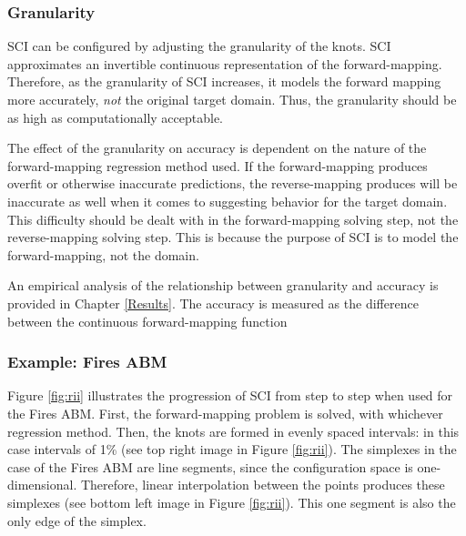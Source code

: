 \subsubsection{Granularity}

SCI can be configured by adjusting the granularity of the knots.
SCI approximates an invertible continuous representation of the forward-mapping.
Therefore, as the granularity of SCI increases, it models the forward mapping more accurately, \textit{not} the original target domain.
Thus, the granularity should be as high as computationally acceptable.

The effect of the granularity on accuracy is dependent on the nature of the forward-mapping regression method used.
If the forward-mapping produces overfit or otherwise inaccurate predictions, the reverse-mapping produces will be inaccurate as well when it comes to suggesting behavior for the target domain.
This difficulty should be dealt with in the forward-mapping solving step, not the reverse-mapping solving step.
This is because the purpose of SCI is to model the forward-mapping, not the domain.

An empirical analysis of the relationship between granularity and accuracy is provided in Chapter \ref{Results}.
The accuracy is measured as the difference between the continuous forward-mapping function


\subsubsection{Example: Fires ABM}

Figure \ref{fig:rii} illustrates the progression of SCI from step to step when used for the Fires ABM.
First, the forward-mapping problem is solved, with whichever regression method.
Then, the knots are formed in evenly spaced intervals: in this case intervals of 1\% (see top right image in Figure \ref{fig:rii}).
The simplexes in the case of the Fires ABM are line segments, since the configuration space is one-dimensional.
Therefore, linear interpolation between the points produces these simplexes (see bottom left image in Figure \ref{fig:rii}).
This one segment is also the only edge of the simplex.


